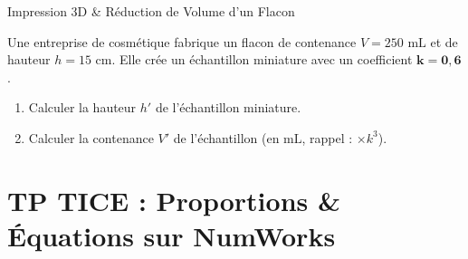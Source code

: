 \begin{exercice}[4 pts][\capRealiser]{Impression 3D \& Réduction de Volume d'un Flacon}
\noindent
\begin{minipage}[c]{0.58\linewidth}
Une entreprise de cosmétique fabrique un flacon de contenance $V = 250\text{ mL}$ et de hauteur $h = 15\text{ cm}$.
Elle crée un échantillon miniature avec un coefficient $\mathbf{k = 0{,}6}$.
\begin{enumerate}[leftmargin=1.2em, itemsep=1pt]
    \item Calculer la hauteur $h'$ de l'échantillon miniature.
    \item Calculer la contenance $V'$ de l'échantillon (en $\text{mL}$, rappel : $\times k^3$).
\end{enumerate}
\end{minipage}\hfill
\begin{minipage}[c]{0.38\linewidth}
\centering
{}
\end{minipage}

\vspace{1mm}
\lignesreponse[2]
\end{exercice}

\section{TP TICE : Proportions \& Équations sur NumWorks}

